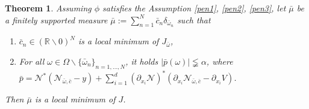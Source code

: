 \documentclass[12pt,fleqn]{amsart}
\newtheorem{theorem}{Theorem}[section]
\theoremstyle{definition}
\begin{document}
\begin{theorem}
\label{sc_opt}
 Assuming $\phi$ satisfies the Assumption \ref{pen1}, \ref{pen2}, \ref{pen3}, let $\bar{\mu}$ be a finitely supported measure $\bar{\mu}:= \sum_{n = 1}^N \bar{c}_n \delta_{\bar{\omega}_n}$ such that 
\begin{enumerate}
	\item $\bar{c}_n \in (\mathbb{R} \backslash 0)^N$ is a local minimum of $J_{\bar{\omega}}$, 
	\item For all $\omega \in \Omega \backslash \{\bar{\omega}_n \}_{n = 1, \dots, N}$, it holds $|\bar{p}(\omega)|  \lneqq  \alpha$, where $\bar{p} = \mathcal{N}^*(\mathcal{N}_{\bar{\omega}, \bar{c}} - y) + \sum_{i=1}^d (\partial_{x_i}\mathcal{N})^*(\partial_{x_i}\mathcal{N}_{\bar{\omega}, \bar{c}} - \partial_{x_i} V)$. 
\end{enumerate}
Then $\bar{\mu}$ is a local minimum of $J$.
\end{theorem}
\end{document}
